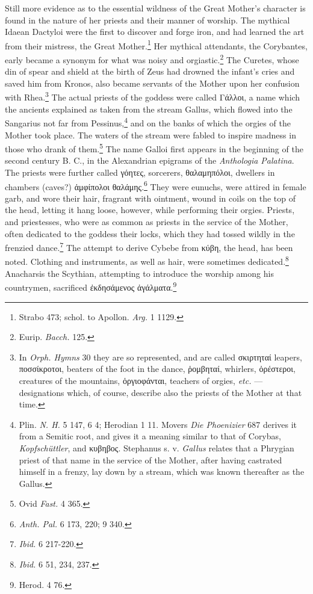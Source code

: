 \documentclass[a4paper, 11pt, oneside, polutonikogreek, english]{article}
\begin{document}
Still more evidence as to the essential wildness of the Great Mother's character is found in the nature of her priests and their manner of worship. The mythical Idaean Dactyloi were the first to discover and forge iron, and had learned the art from their mistress, the Great Mother.\footnote{Strabo 473; schol. to Apollon. \emph{Arg.} 1 1129.} Her mythical attendants, the Corybantes, early became a synonym for what was noisy and orgiastic.\footnote{Eurip. \emph{Bacch.} 125.} The Curetes, whose din of spear and shield at the birth of Zeus had drowned the infant's cries and saved him from Kronos, also became servants of the Mother upon her confusion with Rhea.\footnote{In \emph{Orph. Hymns} 30 they are so represented, and are called σκιρτηταί leapers, ποσσίκροτοι, beaters of the foot in the dance, ῥομβηταί, whirlers, ὀρέστεροι, creatures of the mountains, ὀργιοφάνται, teachers of orgies, \emph{etc.} --- designations which, of course, describe also the priests of the Mother at that time.} The actual priests of the goddess were called Γάλλοι, a name which the ancients explained as taken from the stream Gallus, which flowed into the Sangarius not far from Pessinus,\footnote{Plin. \emph{N. H.} 5 147, 6 4; Herodian 1 11. Movers \emph{Die Phoenizier} 687 derives it from a Semitic root, and gives it a meaning similar to that of Corybas, \emph{Kopfschüttler}, and κυβηβος. Stephanus s. v. \emph{Gallus} relates that a Phrygian priest of that name in the service of the Mother, after having castrated himself in a frenzy, lay down by a stream, which was known thereafter as the Gallus.} and on the banks of which the orgies of the Mother took place. The waters of the stream were fabled to inspire madness in those who drank of them.\footnote{Ovid \emph{Fast.} 4 365.} The name Galloi first appears in the beginning of the second century B. C., in the Alexandrian epigrams of the \emph{Anthologia Palatina}. The priests were further called γόητες, sorcerers, θαλαμηπόλοι, dwellers in chambers (caves?) ἀμφίπολοι θαλάμης.\footnote{\emph{Anth. Pal.} 6 173, 220; 9 340.} They were eunuchs, were attired in female garb, and wore their hair, fragrant with ointment, wound in coils on the top of the head, letting it hang loose, however, while performing their orgies. Priests, and priestesses, who were as common as priests in the service of the Mother, often dedicated to the goddess their locks, which they had tossed wildly in the frenzied dance.\footnote{\emph{Ibid.} 6 217-220.} The attempt to derive Cybebe from κύβη, the head, has been noted. Clothing and instruments, as well as hair, were sometimes dedicated.\footnote{\emph{Ibid.} 6 51, 234, 237.} Anacharsis the Scythian, attempting to introduce the worship among his countrymen, sacrificed ἐκδησάμενος ἀγάλματα.\footnote{Herod. 4 76.}
\end{document}

